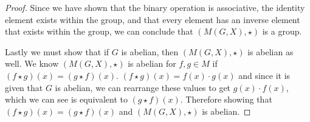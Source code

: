\begin{proof}
Since we have shown that the binary operation is associative, the identity element exists within the group, and that  every element has an inverse element that exists within the group, we can conclude that $(M(G, X), \star)$ is a group.

Lastly we must show that if $G$ is abelian, then $(M(G, X), \star)$ is abelian as well. We know $(M(G, X), \star)$ is abelian for $f,g\in M$ if $(f \star g) (x) = (g \star f) (x)$.
$(f \star g) (x) = f(x) \cdot g(x)$ and since it is given that $G$ is abelian, we can rearrange these values to get $ g(x) \cdot f(x)$, which we can see is equivalent to $(g \star f) (x)$. Therefore showing that $(f \star g) (x) = (g \star f) (x)$ and $(M(G, X), \star)$ is abelian.
\end{proof}

